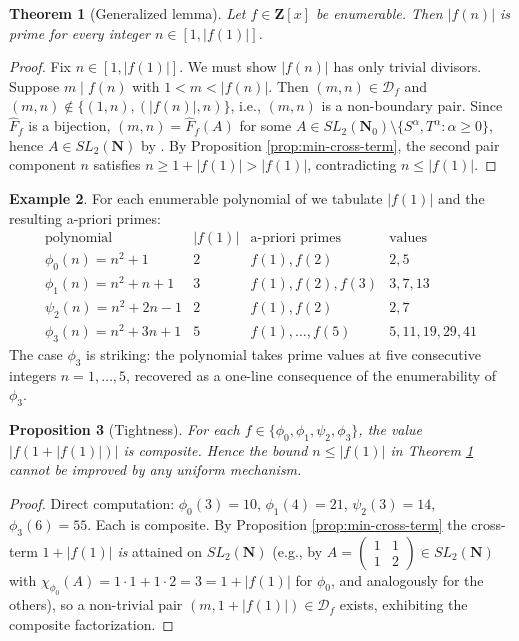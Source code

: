 \documentclass[11pt]{article}
\newtheorem{theorem}{Theorem}[section]
\newtheorem{proposition}[theorem]{Proposition}
\theoremstyle{definition}
\newtheorem{example}[theorem]{Example}
\newcommand{\N}{\mathbf{N}}
\newcommand{\Nz}{\mathbf{N}_0}
\newcommand{\Z}{\mathbf{Z}}
\newcommand{\SLNz}{SL_2(\Nz)}
\newcommand{\SLN}{SL_2(\N)}
\newcommand{\Df}{\mathcal{D}_f}
\newcommand{\Ff}{\hat{F}_f}
\begin{document}
\begin{theorem}[Generalized lemma]\label{thm:gen-lemma}
Let $f \in \Z[x]$ be enumerable. Then $|f(n)|$ is prime for every integer $n \in [1,|f(1)|]$.
\end{theorem}

\begin{proof}
Fix $n \in [1,|f(1)|]$. We must show $|f(n)|$ has only trivial divisors. Suppose $m \mid f(n)$ with $1 < m < |f(n)|$. Then $(m,n) \in \Df$ and $(m,n) \notin \{(1,n),(|f(n)|,n)\}$, i.e., $(m,n)$ is a non-boundary pair. Since $\Ff$ is a bijection, $(m,n) = \Ff(A)$ for some $A \in \SLNz \setminus \{S^\alpha, T^\alpha : \alpha \ge 0\}$, hence $A \in \SLN$ by \cite[Remark 1.4]{shakov}. By Proposition \ref{prop:min-cross-term}, the second pair component $n$ satisfies $n \ge 1+|f(1)| > |f(1)|$, contradicting $n \le |f(1)|$.
\end{proof}

\begin{example}\label{ex:phi3-five-primes}
For each enumerable polynomial of \cite[Theorem 2.5]{shakov} we tabulate $|f(1)|$ and the resulting a-priori primes:
\[
\begin{array}{lcll}
\text{polynomial} & |f(1)| & \text{a-priori primes} & \text{values} \\
\hline
\phi_0(n)=n^2+1            & 2 & f(1),f(2)         & 2,5 \\
\phi_1(n)=n^2+n+1          & 3 & f(1),f(2),f(3)    & 3,7,13 \\
\psi_2(n)=n^2+2n-1         & 2 & f(1),f(2)         & 2,7 \\
\phi_3(n)=n^2+3n+1         & 5 & f(1),\dots,f(5)   & 5,11,19,29,41
\end{array}
\]
The case $\phi_3$ is striking: the polynomial takes prime values at five consecutive integers $n=1,\dots,5$, recovered as a one-line consequence of the enumerability of $\phi_3$.
\end{example}

\begin{proposition}[Tightness]\label{prop:tight}
For each $f \in \{\phi_0,\phi_1,\psi_2,\phi_3\}$, the value $|f(1+|f(1)|)|$ is composite. Hence the bound $n \le |f(1)|$ in Theorem \ref{thm:gen-lemma} cannot be improved by any uniform mechanism.
\end{proposition}

\begin{proof}
Direct computation: $\phi_0(3)=10$, $\phi_1(4)=21$, $\psi_2(3)=14$, $\phi_3(6)=55$. Each is composite. By Proposition \ref{prop:min-cross-term} the cross-term $1+|f(1)|$ \emph{is} attained on $\SLN$ (e.g., by $A = \begin{pmatrix}1 & 1 \\ 1 & 2\end{pmatrix} \in \SLN$ with $\chi_{\phi_0}(A) = 1\cdot 1 + 1\cdot 2 = 3 = 1+|f(1)|$ for $\phi_0$, and analogously for the others), so a non-trivial pair $(m, 1+|f(1)|) \in \Df$ exists, exhibiting the composite factorization.
\end{proof}
\end{document}
